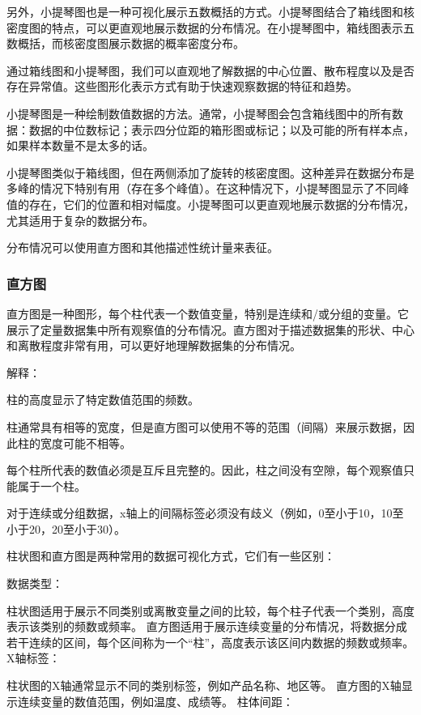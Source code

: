 \documentclass[]{book}
\begin{document}
另外，小提琴图也是一种可视化展示五数概括的方式。小提琴图结合了箱线图和核密度图的特点，可以更直观地展示数据的分布情况。在小提琴图中，箱线图表示五数概括，而核密度图展示数据的概率密度分布。

通过箱线图和小提琴图，我们可以直观地了解数据的中心位置、散布程度以及是否存在异常值。这些图形化表示方式有助于快速观察数据的特征和趋势。

小提琴图是一种绘制数值数据的方法。通常，小提琴图会包含箱线图中的所有数据：数据的中位数标记；表示四分位距的箱形图或标记；以及可能的所有样本点，如果样本数量不是太多的话。

小提琴图类似于箱线图，但在两侧添加了旋转的核密度图。这种差异在数据分布是多峰的情况下特别有用（存在多个峰值）。在这种情况下，小提琴图显示了不同峰值的存在，它们的位置和相对幅度。小提琴图可以更直观地展示数据的分布情况，尤其适用于复杂的数据分布。

分布情况可以使用直方图和其他描述性统计量来表征。

\hypertarget{ux76f4ux65b9ux56fe}{%
\subsubsection{直方图}\label{ux76f4ux65b9ux56fe}}

直方图是一种图形，每个柱代表一个数值变量，特别是连续和/或分组的变量。它展示了定量数据集中所有观察值的分布情况。直方图对于描述数据集的形状、中心和离散程度非常有用，可以更好地理解数据集的分布情况。

解释：

柱的高度显示了特定数值范围的频数。

柱通常具有相等的宽度，但是直方图可以使用不等的范围（间隔）来展示数据，因此柱的宽度可能不相等。

每个柱所代表的数值必须是互斥且完整的。因此，柱之间没有空隙，每个观察值只能属于一个柱。

对于连续或分组数据，x轴上的间隔标签必须没有歧义（例如，0至小于10，10至小于20，20至小于30）。

柱状图和直方图是两种常用的数据可视化方式，它们有一些区别：

数据类型：

柱状图适用于展示不同类别或离散变量之间的比较，每个柱子代表一个类别，高度表示该类别的频数或频率。
直方图适用于展示连续变量的分布情况，将数据分成若干连续的区间，每个区间称为一个``柱''，高度表示该区间内数据的频数或频率。
X轴标签：

柱状图的X轴通常显示不同的类别标签，例如产品名称、地区等。
直方图的X轴显示连续变量的数值范围，例如温度、成绩等。
柱体间距：
\end{document}
